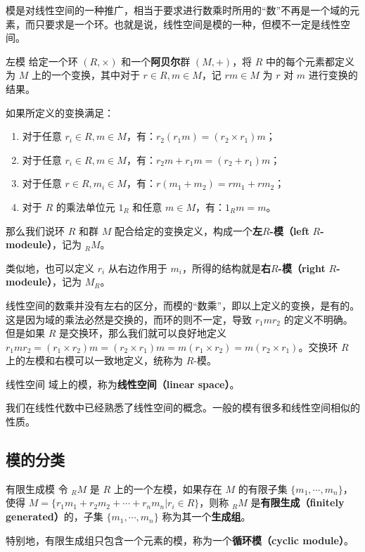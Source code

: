 

模是对线性空间的一种推广，相当于要求进行数乘时所用的“数”不再是一个域的元素，而只要求是一个环。也就是说，线性空间是模的一种，但模不一定是线性空间。

\begin{definition}{左模}
给定一个环 $(R, \times)$ 和一个\textbf{阿贝尔}群 $(M, +)$，将 $R$ 中的每个元素都定义为 $M$ 上的一个变换，其中对于 $r\in R, m\in M$，记 $rm\in M$ 为 $r$ 对 $m$ 进行变换的结果。

如果所定义的变换满足：
\begin{enumerate}
\item 对于任意 $r_i\in R, m\in M$，有：$r_2(r_1m)=(r_2\times r_1)m$；
\item 对于任意 $r_i\in R, m\in M$，有：$r_2m+r_1m=(r_2+r_1)m$；
\item 对于任意 $r\in R, m_i\in M$，有：$r(m_1+m_2)=rm_1+rm_2$；
\item 对于 $R$ 的乘法单位元 $1_R$ 和任意 $m\in M$，有：$1_Rm=m$。
\end{enumerate}

那么我们说环 $R$ 和群 $M$ 配合给定的变换定义，构成一个\textbf{左}$R$\textbf{-模（left} $R$\textbf{-modeule）}，记为 $_RM$。
\end{definition}

类似地，也可以定义 $r_i$ 从右边作用于 $m_i$，所得的结构就是\textbf{右}$R$\textbf{-模（right} $R$\textbf{-modeule）}，记为 $M_R$。

线性空间的数乘并没有左右的区分，而模的“数乘”，即以上定义的变换，是有的。这是因为域的乘法必然是交换的，而环的则不一定，导致 $r_1mr_2$ 的定义不明确。但是如果 $R$ 是交换环，那么我们就可以良好地定义 $r_1mr_2=(r_1\times r_2)m=(r_2\times r_1)m=m(r_1\times r_2)=m(r_2\times r_1)$。交换环 $R$ 上的左模和右模可以一致地定义，统称为 $R$-模。

\begin{definition}{线性空间}
域上的模，称为\textbf{线性空间（linear space）}。
\end{definition}

我们在线性代数中已经熟悉了线性空间的概念。一般的模有很多和线性空间相似的性质。

\subsection{模的分类}

\begin{definition}{有限生成模}
令 $_RM$ 是 $R$ 上的一个左模，如果存在 $M$ 的有限子集 $\{m_1, \cdots, m_n\}$，使得 $M=\{r_1m_1+r_2m_2+\cdots+r_nm_n|r_i\in R\}$，则称 $_RM$ 是\textbf{有限生成（finitely generated）}的，子集 $\{m_1, \cdots, m_n\}$ 称为其一个\textbf{生成组}。

特别地，有限生成组只包含一个元素的模，称为一个\textbf{循环模（cyclic module）}。
\end{definition}


